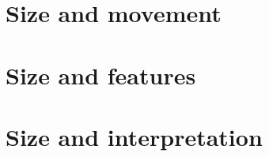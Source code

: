 \documentclass[output=book,
               collection,
               multiauthors,
              ]{langscibook}
\begin{document}
\maketitle
\frontmatter

{\sloppy\tableofcontents}


%

\mainmatter


\part{Size and movement}

\part{Size and features}

\part{Size and interpretation}


\end{document}
